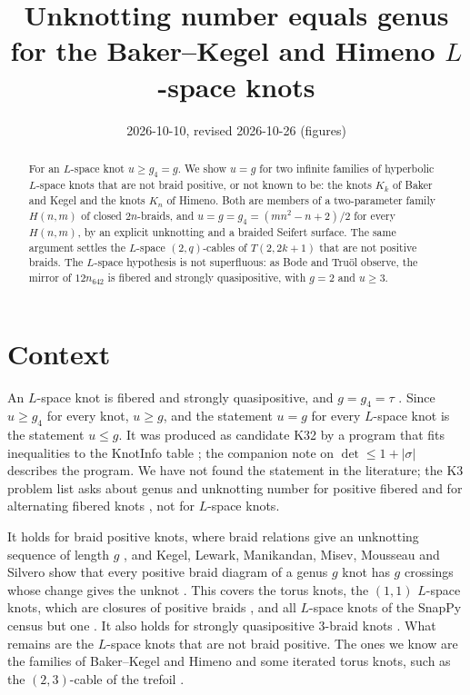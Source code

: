 \documentclass[11pt]{article}
\title{Unknotting number equals genus for the Baker--Kegel and Himeno $L$-space knots}
\date{2026-10-10, revised 2026-10-26 (figures)}
\begin{document}
\maketitle

\begin{abstract}
For an $L$-space knot $u \ge g_4 = g$. We show $u = g$ for two infinite families of hyperbolic $L$-space knots that
are not braid positive, or not known to be: the knots $K_k$ of Baker and Kegel and the knots $K_n$ of Himeno. Both are
members of a two-parameter family $H(n,m)$ of closed $2n$-braids, and $u = g = g_4 = (mn^2-n+2)/2$ for every
$H(n,m)$, by an explicit unknotting and a braided Seifert surface. The same argument settles the $L$-space $(2,q)$-cables of $T(2,2k+1)$ that are not positive braids.
The $L$-space hypothesis is not superfluous: as Bode and Tru\"ol observe, the mirror of $12n_{642}$ is fibered and
strongly quasipositive, with $g = 2$ and $u \ge 3$.
\end{abstract}

\section{Context}

An $L$-space knot is fibered and strongly quasipositive, and $g = g_4 = \tau$ \cite{OS, Ni, Hedden2}. Since
$u \ge g_4$ for every knot, $u \ge g$, and the statement $u = g$ for every $L$-space knot is the statement $u \le g$.
It was produced as candidate K32 by a program that fits inequalities to the KnotInfo table \cite{KnotInfo}; the
companion note on $\det \le 1 + |\sigma|$ describes the program. We have not found the statement in the literature;
the K3 problem list asks about genus and unknotting number for positive fibered and for alternating fibered knots
\cite[Problem 1.5]{K3}, not for $L$-space knots.

It holds for braid positive knots, where braid relations give an unknotting sequence of length $g$
\cite{BW84, Rud83}, and Kegel, Lewark, Manikandan, Misev,
Mousseau and Silvero show that every positive braid diagram of a genus $g$ knot has $g$ crossings whose change gives
the unknot \cite{KLMMMS}. This covers the torus knots, the $(1,1)$ $L$-space knots, which are closures of positive
braids \cite[Theorem 2]{Nie}, and all $L$-space knots of the SnapPy census but one \cite{BK}. It also holds for
strongly quasipositive $3$-braid knots \cite{LeeLee}. What remains are the $L$-space knots that are not braid positive.
The ones we know are the families of Baker--Kegel \cite{BK} and Himeno \cite{Himeno} and some iterated torus knots,
such as the $(2,3)$-cable of the trefoil \cite[Example 1]{BK}.
\end{document}
